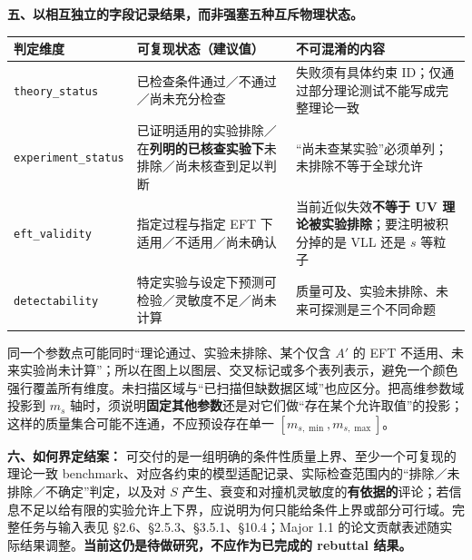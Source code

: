 \documentclass[
  chinese,
  UTF8]{ctexart}
\newcounter{none} %
\begin{document}
\textbf{五、以相互独立的字段记录结果，而非强塞五种互斥物理状态。}

{\def\LTcaptype{none} %
\begin{longtable}[]{@{}
  >{\raggedright\arraybackslash}p{}
  >{\raggedright\arraybackslash}p{}
  >{\raggedright\arraybackslash}p{}@{}}
\toprule\noalign{}
\begin{minipage}[b]{\linewidth}\raggedright
判定维度
\end{minipage} & \begin{minipage}[b]{\linewidth}\raggedright
可复现状态（建议值）
\end{minipage} & \begin{minipage}[b]{\linewidth}\raggedright
不可混淆的内容
\end{minipage} \\
\midrule\noalign{}
\endhead
\bottomrule\noalign{}
\endlastfoot
\texttt{theory\_status} & 已检查条件通过／不通过／尚未充分检查 &
失败须有具体约束 ID；仅通过部分理论测试不能写成完整理论一致 \\
\texttt{experiment\_status} &
已证明适用的实验排除／在\textbf{列明的已核查实验下}未排除／尚未核查到足以判断
& ``尚未查某实验''必须单列；未排除不等于全球允许 \\
\texttt{eft\_validity} & 指定过程与指定 EFT 下适用／不适用／尚未确认 &
当前近似失效\textbf{不等于 UV 理论被实验排除}；要注明被积分掉的是 VLL
还是 \(s\) 等粒子 \\
\texttt{detectability} &
特定实验与设定下预测可检验／灵敏度不足／尚未计算 &
质量可及、实验未排除、未来可探测是三个不同命题 \\
\end{longtable}
}

同一个参数点可能同时``理论通过、实验未排除、某个仅含 \(A'\) 的 EFT
不适用、未来实验尚未计算''；所以在图上以图层、交叉标记或多个表列表示，避免一个颜色强行覆盖所有维度。未扫描区域与``已扫描但缺数据区域''也应区分。把高维参数域投影到
\(m_s\)
轴时，须说明\textbf{固定其他参数}还是对它们做``存在某个允许取值''的投影；这样的质量集合可能不连通，不应预设存在单一
\([m_{s,\min},m_{s,\max}]\)。

\textbf{六、如何界定结案：}
可交付的是一组明确的条件性质量上界、至少一个可复现的理论一致
benchmark、对应各约束的模型适配记录、实际检查范围内的``排除／未排除／不确定''判定，以及对
\(S\)
产生、衰变和对撞机灵敏度的\textbf{有依据的}评论；若信息不足以给有限的实验允许上下界，应说明为何只能给条件上界或部分可行域。完整任务与输入表见
§2.6、§2.5.3、§3.5.1、§10.4；Major 1.1
的论文贡献表述随实际结果调整。\textbf{当前这仍是待做研究，不应作为已完成的
rebuttal 结果。}
\end{document}

